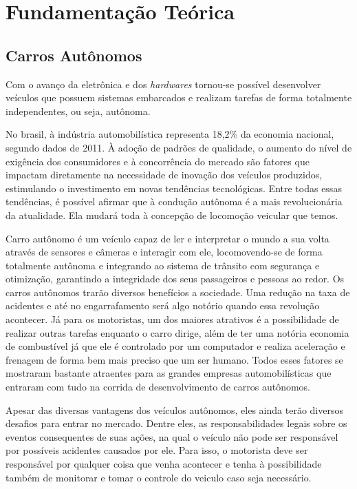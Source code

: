 \chapter{Fundamentação Teórica}
\label{cap:fundamentacao-teorica}

\section{Carros Autônomos}
\label{sec:carros autonomos}

Com o avanço da eletrônica e dos \textit{hardwares} tornou-se possível desenvolver veículos que possuem sistemas embarcados e realizam tarefas de forma totalmente independentes, ou seja, autônoma. \cite{rodrigues2017fundamentos}

No brasil, à indústria automobilística representa 18,2\% da economia nacional, segundo dados de 2011. À adoção de padrões de qualidade, o aumento do nível de exigência dos consumidores e à concorrência do mercado são fatores que impactam diretamente na necessidade de inovação dos veículos produzidos, estimulando o investimento em novas tendências tecnológicas. Entre todas essas tendências, é possível afirmar que à condução autônoma é a mais revolucionária da atualidade. Ela mudará toda à concepção de locomoção veicular que temos. \cite{ rodrigues2017fundamentos}

Carro autônomo é um veículo capaz de ler e interpretar o mundo a sua volta através de sensores e câmeras e interagir com ele, locomovendo-se de forma totalmente autônoma e integrando ao sistema de trânsito com segurança e otimização, garantindo a integridade dos seus passageiros e pessoas ao redor.
Os carros autônomos trarão diversos benefícios a sociedade. Uma redução na taxa de acidentes e até no engarrafamento será algo notório quando essa revolução acontecer. Já para os motoristas, um dos maiores atrativos é a possibilidade de realizar outras tarefas enquanto o carro dirige, além de ter uma notória economia de combustível já que ele é controlado por um computador e realiza aceleração e frenagem de forma bem mais preciso que um ser humano. Todos esses fatores se mostraram bastante atraentes para as grandes empresas automobilísticas que entraram com tudo na corrida de desenvolvimento de carros autônomos. \cite{inproceedings,rodrigues2017fundamentos}

Apesar das diversas vantagens dos veículos autônomos, eles ainda terão diversos desafios para entrar no mercado. Dentre eles, as responsabilidades legais sobre os eventos consequentes de suas ações, na qual o veículo não pode ser responsável por possíveis acidentes causados por ele. Para isso, o motorista deve ser responsável por qualquer coisa que venha acontecer e tenha à possibilidade também de monitorar e tomar o controle do veiculo caso seja necessário. \cite{inproceedings}

